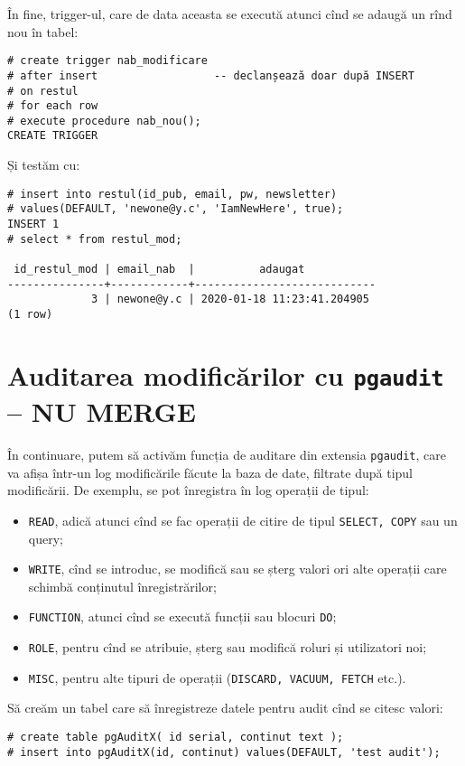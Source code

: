 În fine, trigger-ul, care de data aceasta se execută atunci cînd
se adaugă un rînd nou în tabel:
{
  \small
\begin{verbatim}
# create trigger nab_modificare
# after insert                  -- declanșează doar după INSERT
# on restul
# for each row
# execute procedure nab_nou();
CREATE TRIGGER
\end{verbatim}
}

Și testăm cu:
{
  \small
\begin{verbatim}
# insert into restul(id_pub, email, pw, newsletter) 
# values(DEFAULT, 'newone@y.c', 'IamNewHere', true);
INSERT 1
# select * from restul_mod;

 id_restul_mod | email_nab  |          adaugat           
---------------+------------+----------------------------
             3 | newone@y.c | 2020-01-18 11:23:41.204905
(1 row)
\end{verbatim}
}


\section{Auditarea modificărilor cu \texttt{pgaudit} -- NU MERGE}

În continuare, putem să activăm funcția de auditare din extensia
\texttt{pgaudit}, care va afișa într-un log modificările făcute la baza de
date, filtrate după tipul modificării. De exemplu, se pot înregistra în
log operații de tipul:
\begin{itemize}
\item \texttt{READ}, adică atunci cînd se fac operații de citire de tipul
  \texttt{SELECT, COPY} sau un query;
\item \texttt{WRITE}, cînd se introduc, se modifică sau se șterg valori ori
  alte operații care schimbă conținutul înregistrărilor;
\item \texttt{FUNCTION}, atunci cînd se execută funcții sau blocuri \texttt{DO};
\item \texttt{ROLE}, pentru cînd se atribuie, șterg sau modifică roluri și
  utilizatori noi;
\item \texttt{MISC}, pentru alte tipuri de operații
  (\texttt{DISCARD, VACUUM, FETCH} etc.).
\end{itemize}

Să creăm un tabel care să înregistreze datele pentru audit cînd se citesc valori:
{
  \small
\begin{verbatim}
# create table pgAuditX( id serial, continut text );
# insert into pgAuditX(id, continut) values(DEFAULT, 'test audit');
\end{verbatim}
}

